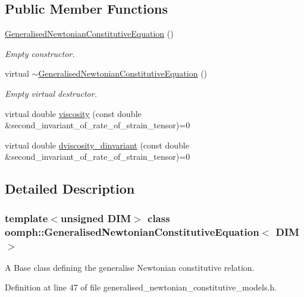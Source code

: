 \subsection*{Public Member Functions}
\begin{DoxyCompactItemize}
\item 
\hyperlink{classoomph_1_1GeneralisedNewtonianConstitutiveEquation_a4b84eb3626aaed2f77f6dc96258f7e01}{Generalised\+Newtonian\+Constitutive\+Equation} ()
\begin{DoxyCompactList}\small\item\em Empty constructor. \end{DoxyCompactList}\item 
virtual \hyperlink{classoomph_1_1GeneralisedNewtonianConstitutiveEquation_af85f107604d04e8fdaf03e8274c485e6}{$\sim$\+Generalised\+Newtonian\+Constitutive\+Equation} ()
\begin{DoxyCompactList}\small\item\em Empty virtual destructor. \end{DoxyCompactList}\item 
virtual double \hyperlink{classoomph_1_1GeneralisedNewtonianConstitutiveEquation_a3e6d811786e39ca3c3a9b1c46249442f}{viscosity} (const double \&second\+\_\+invariant\+\_\+of\+\_\+rate\+\_\+of\+\_\+strain\+\_\+tensor)=0
\item 
virtual double \hyperlink{classoomph_1_1GeneralisedNewtonianConstitutiveEquation_ad0164e6ca57cc986048346e12c4d353a}{dviscosity\+\_\+dinvariant} (const double \&second\+\_\+invariant\+\_\+of\+\_\+rate\+\_\+of\+\_\+strain\+\_\+tensor)=0
\end{DoxyCompactItemize}


\subsection{Detailed Description}
\subsubsection*{template$<$unsigned D\+IM$>$\newline
class oomph\+::\+Generalised\+Newtonian\+Constitutive\+Equation$<$ D\+I\+M $>$}

A Base class defining the generalise Newtonian constitutive relation. 

Definition at line 47 of file generalised\+\_\+newtonian\+\_\+constitutive\+\_\+models.\+h.



